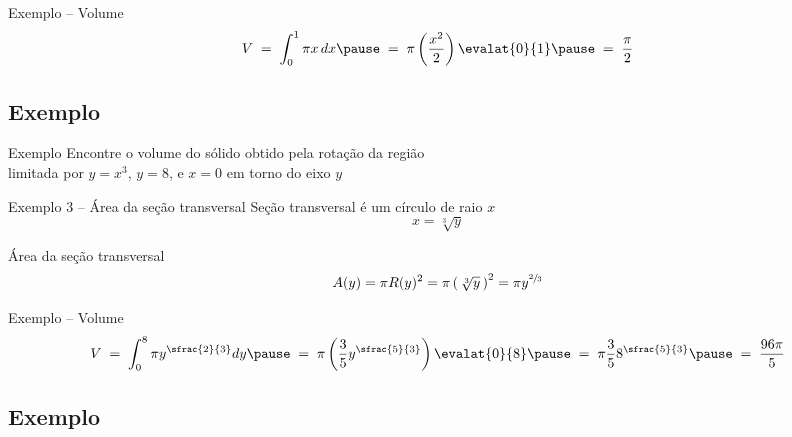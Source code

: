 \documentclass[fleqn,utf8,aspectratio=169,12pt]{beamer}
\begin{document}
\begin{frame}{Exemplo \theexemplo{} -- Volume}
  \[
    V
    \;=\; \int_0^1 \pi x \, dx
    \pause
    \;=\; \pi \left( \frac{x^2}{2}\right) \evalat{0}{1}
    \pause
    \;=\; \frac{\pi}{2}
  \]
\end{frame}

\addtocounter{exemplo}{1}
\subsection{Exemplo \theexemplo}

\begin{frame}{Exemplo \theexemplo{}}
  Encontre o volume do sólido obtido pela rotação da região \\
  limitada por $y = x^3$, $y = 8$, e $x = 0$ em torno do eixo $y$
\end{frame}


\begin{frame}{Exemplo 3 -- Área da seção transversal}
  Seção transversal é um círculo de raio $x$
  \[
    x = \sqrt[3]{y}
  \]

  \pause
  \vspace{\baselineskip}
  Área da seção transversal
  \[
    A(y)
    = \pi R(y)^2
    = \pi \left( \,\sqrt[3]{y}\, \right)^2
    = \pi y^{\sfrac{2}{3}}
  \]
\end{frame}

\begin{frame}{Exemplo \theexemplo{} -- Volume}
  \[
    V
    \;=\; \int_0^8 \pi y^{\sfrac{2}{3}}dy
    \pause
    \;=\; \pi \left( \frac{3}{5} y^{\sfrac{5}{3}}\right) \evalat{0}{8}
    \pause
    \;=\; \pi \frac{3}{5} 8^{\sfrac{5}{3}}
    \pause
    \;=\; \frac{96 \pi}{5}
  \]
\end{frame}

\addtocounter{exemplo}{1}
\subsection{Exemplo \theexemplo}
\end{document}
